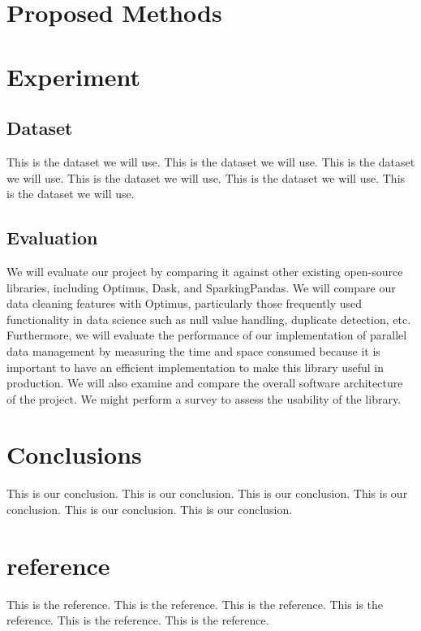 \documentclass[sigconf]{acmart}
\begin{document}
\section{Proposed Methods}

\section{Experiment}
\subsection{Dataset}
This is the dataset we will use.
This is the dataset we will use.
This is the dataset we will use.
This is the dataset we will use.
This is the dataset we will use.
This is the dataset we will use.

\subsection{Evaluation}
We will evaluate our project by comparing it against other existing open-source libraries, including Optimus, Dask, and SparkingPandas. We will compare our data cleaning features with Optimus, particularly those frequently used functionality in data science such as null value handling, duplicate detection, etc. Furthermore, we will evaluate the performance of our implementation of parallel data management by measuring the time and space consumed because it is important to have an efficient implementation to make this library useful in production. We will also examine and compare the overall software architecture of the project. We might perform a survey to assess the usability of the library.


\section{Conclusions}
This is our conclusion.
This is our conclusion.
This is our conclusion.
This is our conclusion.
This is our conclusion.
This is our conclusion.


\section{reference}
This is the reference.
This is the reference.
This is the reference.
This is the reference.
This is the reference.
This is the reference.
\end{document}
